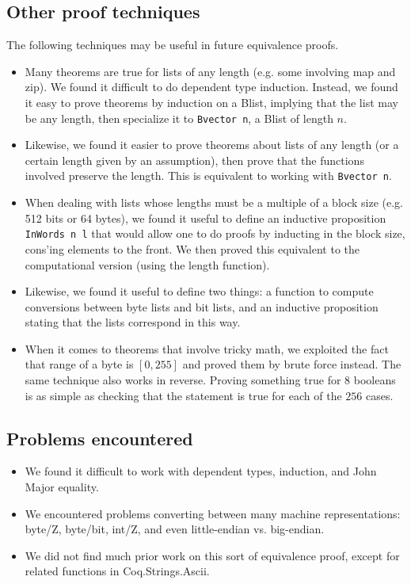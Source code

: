 \documentclass[twocolumn,showpacs,%
  nofootinbib,aps,superscriptaddress,%
  eqsecnum,prd,notitlepage,showkeys,10pt]{revtex4-1}
\begin{document}
\subsection{Other proof techniques}

The following techniques may be useful in future equivalence proofs.

\begin{itemize}
\item Many theorems are true for lists of any length (e.g. some involving map and zip). We found it difficult to do dependent type induction. Instead, we found it easy to prove theorems by induction on a Blist, implying that the list may be any length, then specialize it to \verb|Bvector n|, a Blist of length $n$. 
\item Likewise, we found it easier to prove theorems about lists of any length (or a certain length given by an assumption), then prove that the functions involved preserve the length. This is equivalent to working with \verb|Bvector n|.
\item When dealing with lists whose lengths must be a multiple of a block size (e.g. 512 bits or 64 bytes), we found it useful to define an inductive proposition \verb|InWords n l| that would allow one to do proofs by inducting in the block size, cons'ing elements to the front. We then proved this equivalent to the computational version (using the length function).
\item Likewise, we found it useful to define two things: a function to compute conversions between byte lists and bit lists, and an inductive proposition stating that the lists correspond in this way.
\item When it comes to theorems that involve tricky math, we exploited the fact that range of a byte is $[0, 255]$ and proved them by brute force instead. The same technique also works in reverse. Proving something true for $8$ booleans is as simple as checking that the statement is true for each of the $256$ cases.
\end{itemize}

\subsection{Problems encountered}

\begin{itemize}
\item We found it difficult to work with dependent types, induction, and John Major equality.
\item We encountered problems converting between many machine representations: byte/Z, byte/bit, int/Z, and even little-endian vs. big-endian.
\item We did not find much prior work on this sort of equivalence proof, except for related functions in Coq.Strings.Ascii.
\end{itemize}
\end{document}
